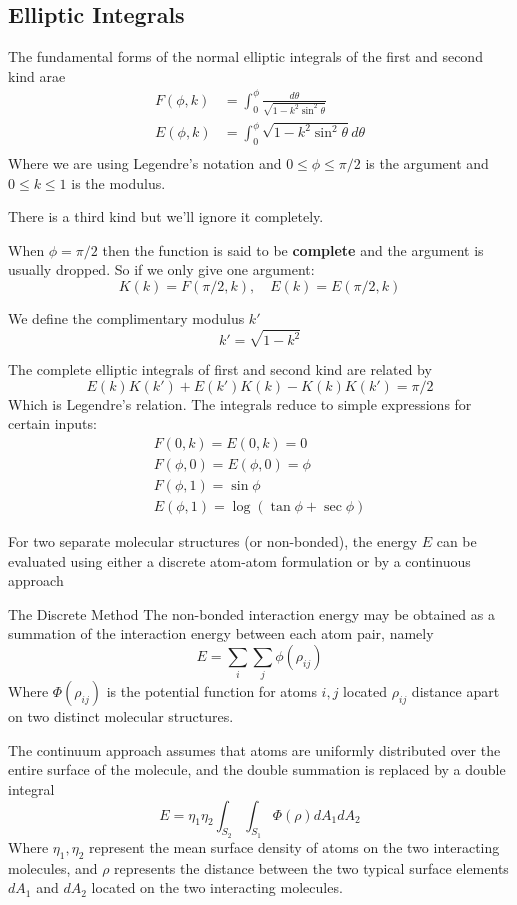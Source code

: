 \documentclass{X:/Documents/Coding/Latex/myassignment}
\begin{document}
\subsection{Elliptic Integrals}
The fundamental forms of the normal elliptic integrals of the first and second kind arae
\begin{align*}
	F(\phi,k) &= \int_0^\phi \frac{d\theta}{\sqrt{1-k^2\sin^2\theta}}\\
	E(\phi,k) &= \int_0^\phi \sqrt{1-k^2\sin^2\theta} d\theta\\
\end{align*}
Where we are using Legendre's notation and $0\leq \phi \leq \pi/2$ is the argument and $0\leq k \leq 1$ is the modulus.

There is a third kind but we'll ignore it completely.

When $\phi =\pi/2$ then the function is said to be \textbf{complete} and the argument is usually dropped. So if we only give one argument:
\[K(k) = F(\pi/2,k),\quad E(k) = E(\pi/2,k)\]

We define the complimentary modulus $k'$
\[k' = \sqrt{1-k^2}\]

The complete elliptic integrals of first and second kind are related by
\[E(k)K(k') + E(k') K(k) - K(k)K(k') = \pi/2\]
Which is Legendre's relation.
The integrals reduce to simple expressions for certain inputs:
\begin{align*}
	F(0,k) = E(0,k) = 0\\
	F(\phi,0) = E(\phi,0) = \phi\\
	F(\phi,1) = \sin\phi\\
	E(\phi,1) = \log(\tan\phi + \sec\phi) 
\end{align*}

For two separate molecular structures (or non-bonded), the energy $E$ can be evaluated using either a discrete atom-atom formulation or by a continuous approach

The Discrete Method
The non-bonded interaction energy may be obtained as a summation of the interaction energy between each atom pair, namely
\[E = \sum_i \sum_j \phi(\rho_{ij})\]
Where $\Phi(\rho_{ij})$ is the potential function for atoms $i,j$ located $\rho_{ij}$ distance apart on two distinct molecular structures. 

The continuum approach assumes that atoms are uniformly distributed over the entire surface of the molecule, and the double summation is replaced by a double integral
\[E = \eta_1 \eta_2 \int_{S_2} \int_{S_1} \Phi(\rho) dA_1 dA_2\]
Where $\eta_1,\eta_2$ represent the mean surface density of atoms on the two interacting molecules, and $\rho$ represents the distance between the two typical surface elements $dA_1$ and $dA_2$ located on the two interacting molecules.
\end{document}
